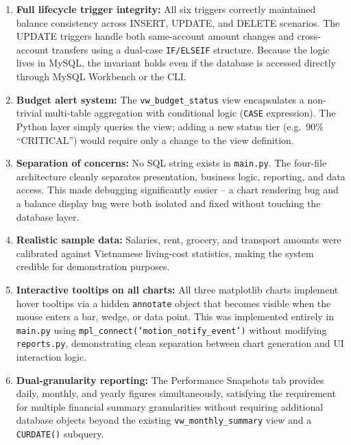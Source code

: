 \documentclass[12pt, a4paper]{article}
\begin{document}
\begin{enumerate}[leftmargin=2em]
  \item \textbf{Full lifecycle trigger integrity:} All six triggers correctly maintained
        balance consistency across INSERT, UPDATE, and DELETE scenarios. The UPDATE
        triggers handle both same-account amount changes and cross-account transfers
        using a dual-case \texttt{IF/ELSEIF} structure. Because the logic lives in
        MySQL, the invariant holds even if the database is accessed directly through
        MySQL Workbench or the CLI.

  \item \textbf{Budget alert system:} The \texttt{vw\_budget\_status} view encapsulates
        a non-trivial multi-table aggregation with conditional logic (\texttt{CASE}
        expression). The Python layer simply queries the view; adding a new status tier
        (e.g.\ 90\% ``CRITICAL'') would require only a change to the view definition.

  \item \textbf{Separation of concerns:} No SQL string exists in \texttt{main.py}.
        The four-file architecture cleanly separates presentation, business logic,
        reporting, and data access. This made debugging significantly easier -- a chart
        rendering bug and a balance display bug were both isolated and fixed without
        touching the database layer.

  \item \textbf{Realistic sample data:} Salaries, rent, grocery, and transport amounts
        were calibrated against Vietnamese living-cost statistics, making the system
        credible for demonstration purposes.

  \item \textbf{Interactive tooltips on all charts:} All three matplotlib charts
        implement hover tooltips via a hidden \texttt{annotate} object that becomes
        visible when the mouse enters a bar, wedge, or data point. This was implemented
        entirely in \texttt{main.py} using \texttt{mpl\_connect('motion\_notify\_event')}
        without modifying \texttt{reports.py}, demonstrating clean separation between
        chart generation and UI interaction logic.

  \item \textbf{Dual-granularity reporting:} The Performance Snapshots tab provides
        daily, monthly, and yearly figures simultaneously, satisfying the requirement
        for multiple financial summary granularities without requiring additional
        database objects beyond the existing \texttt{vw\_monthly\_summary} view and
        a \texttt{CURDATE()} subquery.
\end{enumerate}
\end{document}
